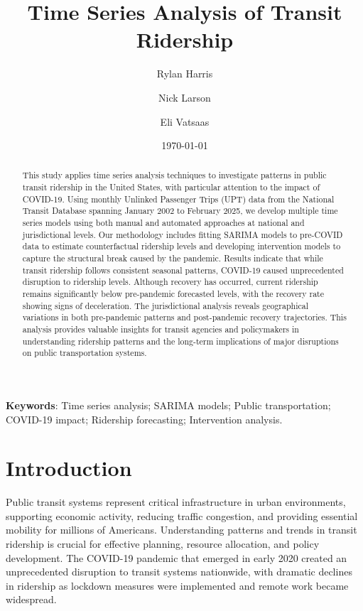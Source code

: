 \documentclass[11pt]{article}
\title{\textbf{Time Series Analysis of Transit Ridership}\vspace{5pt}}
\author[1]{Rylan Harris}
\author[1]{Nick Larson}
\author[1,2]{Eli Vatsaas}
\affil[1]{Department of Mathematics and Statistics, Northern Arizona University, Flagstaff, AZ 86011, USA}
\date{\today}
\begin{document}

\maketitle

\begin{abstract}
This study applies time series analysis techniques to investigate patterns in public transit ridership in the United States, with particular attention to the impact of COVID-19. Using monthly Unlinked Passenger Trips (UPT) data from the National Transit Database spanning January 2002 to February 2025, we develop multiple time series models using both manual and automated approaches at national and jurisdictional levels. Our methodology includes fitting SARIMA models to pre-COVID data to estimate counterfactual ridership levels and developing intervention models to capture the structural break caused by the pandemic. Results indicate that while transit ridership follows consistent seasonal patterns, COVID-19 caused unprecedented disruption to ridership levels. Although recovery has occurred, current ridership remains significantly below pre-pandemic forecasted levels, with the recovery rate showing signs of deceleration. The jurisdictional analysis reveals geographical variations in both pre-pandemic patterns and post-pandemic recovery trajectories. This analysis provides valuable insights for transit agencies and policymakers in understanding ridership patterns and the long-term implications of major disruptions on public transportation systems.
\end{abstract}

\vspace{8pt}
\noindent
\textbf{Keywords}: Time series analysis; SARIMA models; Public transportation; COVID-19 impact; Ridership forecasting; Intervention analysis.

\section{Introduction}

Public transit systems represent critical infrastructure in urban environments, supporting economic activity, reducing traffic congestion, and providing essential mobility for millions of Americans. Understanding patterns and trends in transit ridership is crucial for effective planning, resource allocation, and policy development. The COVID-19 pandemic that emerged in early 2020 created an unprecedented disruption to transit systems nationwide, with dramatic declines in ridership as lockdown measures were implemented and remote work became widespread.
\end{document}
